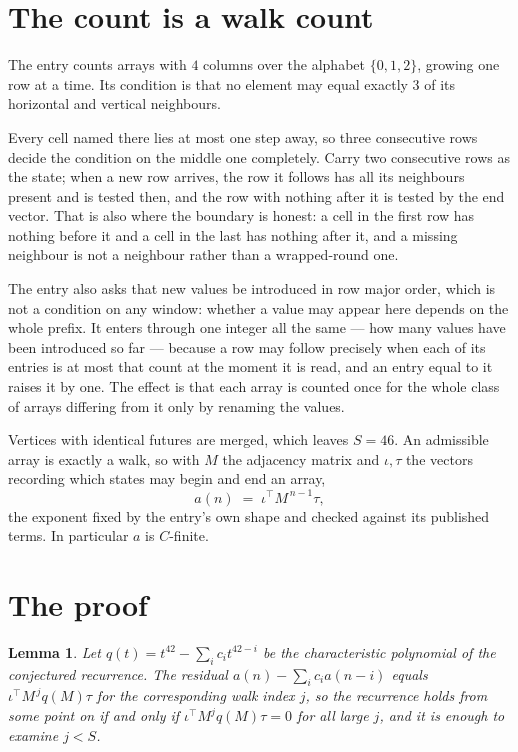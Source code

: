 \documentclass[11pt,a4paper]{article}
\theoremstyle{plain}
\newtheorem{lemma}[theorem]{Lemma}
\theoremstyle{definition}
\begin{document}
\section{The count is a walk count}

The entry counts arrays with $4$ columns over the alphabet $\{0,1,2\}$, growing one row at a time. Its condition is that no element may equal exactly $3$ of its horizontal and vertical neighbours.

Every cell named there lies at most one step away, so three consecutive rows decide the condition on the middle one completely. Carry two consecutive rows as the state; when a new row arrives, the row it follows has all its neighbours present and is tested then, and the row with nothing after it is tested by the end vector. That is also where the boundary is honest: a cell in the first row has nothing before it and a cell in the last has nothing after it, and a missing neighbour is not a neighbour rather than a wrapped-round one.

The entry also asks that new values be introduced in row major order, which is not a condition on any window: whether a value may appear here depends on the whole prefix. It enters through one integer all the same --- how many values have been introduced so far --- because a row may follow precisely when each of its entries is at most that count at the moment it is read, and an entry equal to it raises it by one. The effect is that each array is counted once for the whole class of arrays differing from it only by renaming the values.

Vertices with identical futures are merged, which leaves $S=46$. An admissible array is exactly a walk, so with $M$ the adjacency matrix and $\iota,\tau$ the vectors recording which states may begin and end an array,
\[
a(n)\;=\;\iota^{\!\top}M^{\,n-1}\tau ,
\]
the exponent fixed by the entry's own shape and checked against its published terms. In
particular $a$ is $C$-finite.

\section{The proof}

\begin{lemma}\label{lem:crit}
Let $q(t)=t^{42}-\sum_i c_it^{42-i}$ be the characteristic polynomial of the
conjectured recurrence. The residual $a(n)-\sum_ic_ia(n-i)$ equals
$\iota^{\!\top}M^{\,j}q(M)\tau$ for the corresponding walk index $j$, so the recurrence
holds from some point on if and only if $\iota^{\!\top}M^{j}q(M)\tau=0$ for all large $j$,
and it is enough to examine $j<S$.
\end{lemma}
\end{document}
